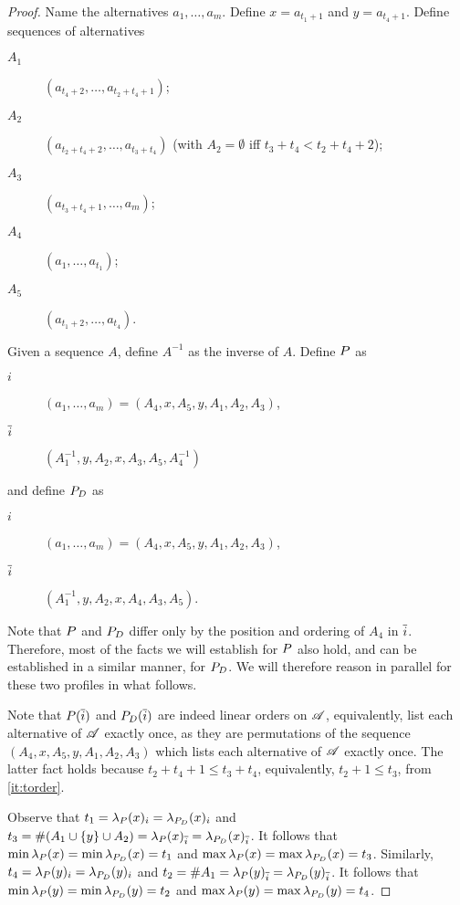 \documentclass[pagesize, twoside=off, bibliography=totoc, DIV=calc, fontsize=12pt, a4paper]{scrartcl}
\begin{document}
\begin{proof}
	Name the alternatives $a_1, …, a_m$.
	Define $x = a_{t_1 + 1}$ and $y = a_{t_4 + 1}$.
	Define sequences of alternatives 
	\begin{description}
		\item[$A_1$] $(a_{t_4 + 2}, …, a_{t_2 + t_4 + 1})$;
		\item[$A_2$] $(a_{t_2 + t_4 + 2}, …, a_{t_3 + t_4})$ (with $A_2 = \emptyset$ iff $t_3 + t_4 < t_2 + t_4 + 2$);
		\item[$A_3$] $(a_{t_3 + t_4 + 1}, …, a_m)$;
		\item[$A_4$] $(a_1, …, a_{t_1})$;
		\item[$A_5$] $(a_{t_1 + 2}, …, a_{t_4})$.
	\end{description}
	Given a sequence $A$, define $A^{-1}$ as the inverse of $A$.
	Define $P$ as
	\begin{description}
		\item[$i$] $(a_1, …, a_m) = (A_4, x, A_5, y, A_1, A_2, A_3)$,
		\item[$\overline{i}$] $(A_1^{-1}, y, A_2, x, A_3, A_5, A_4^{-1})$
	\end{description}
	and define $P_D$ as
	\begin{description}
		\item[$i$] $(a_1, …, a_m) = (A_4, x, A_5, y, A_1, A_2, A_3)$,
		\item[$\overline{i}$] $(A_1^{-1}, y, A_2, x, A_4, A_3, A_5)$.
	\end{description}
	Note that $P$ and $P_D$ differ only by the position and ordering of $A_4$ in $\overline{i}$. Therefore, most of the facts we will establish for $P$ also hold, and can be established in a similar manner, for $P_D$.
	We will therefore reason in parallel for these two profiles in what follows.
	
	Note that $P(\overline{i})$ and $P_D(\overline{i})$ are indeed linear orders on $\mathscr{A}$, equivalently, list each alternative of $\mathscr{A}$ exactly once, as they are permutations of the sequence $(A_4, x, A_5, y, A_1, A_2, A_3)$ which lists each alternative of $\mathscr{A}$ exactly once. The latter fact holds because $t_2 + t_4 + 1 ≤ t_3 + t_4$, equivalently, $t_2 + 1 ≤ t_3$, from \cref{it:torder}.
	
	Observe that $t_1 = \lambda_P(x)_i = \lambda_{P_D}(x)_i$ and $t_3 = \# (A_1 \cup \{y\} \cup A_2) = \lambda_P(x)_{\overline{i}} = \lambda_{P_D}(x)_{\overline{i}}$. It follows that $\min \lambda_P(x) = \min \lambda_{P_D}(x) = t_1$ and $\max \lambda_P(x) = \max \lambda_{P_D}(x) = t_3$.
	Similarly, $t_4 = \lambda_P(y)_i = \lambda_{P_D}(y)_i$ and $t_2 = \# A_1 = \lambda_P(y)_{\overline{i}} = \lambda_{P_D}(y)_{\overline{i}}$. It follows that $\min \lambda_P(y) = \min \lambda_{P_D}(y) = t_2$ and $\max \lambda_P(y) = \max \lambda_{P_D}(y) = t_4$.


\end{proof}
\end{document}
